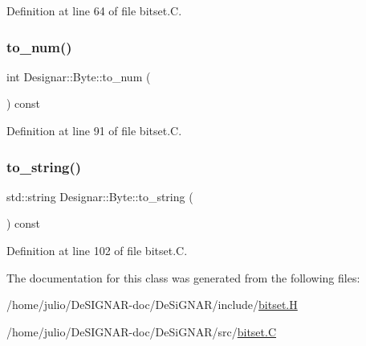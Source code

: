 Definition at line 64 of file bitset.\+C.

\mbox{\label{class_designar_1_1_byte_a1f10a6e5ad399f62c0d53ace68c7e43d}} 
\subsubsection{\texorpdfstring{to\+\_\+num()}{to\_num()}}
{\footnotesize\ttfamily int Designar\+::\+Byte\+::to\+\_\+num (\begin{DoxyParamCaption}{ }\end{DoxyParamCaption}) const}



Definition at line 91 of file bitset.\+C.

\mbox{\label{class_designar_1_1_byte_afddf5962874234208805ece07f31916d}} 
\subsubsection{\texorpdfstring{to\+\_\+string()}{to\_string()}}
{\footnotesize\ttfamily std\+::string Designar\+::\+Byte\+::to\+\_\+string (\begin{DoxyParamCaption}{ }\end{DoxyParamCaption}) const}



Definition at line 102 of file bitset.\+C.



The documentation for this class was generated from the following files\+:\begin{DoxyCompactItemize}
\item 
/home/julio/\+De\+S\+I\+G\+N\+A\+R-\/doc/\+De\+Si\+G\+N\+A\+R/include/\hyperlink{bitset_8_h}{bitset.\+H}\item 
/home/julio/\+De\+S\+I\+G\+N\+A\+R-\/doc/\+De\+Si\+G\+N\+A\+R/src/\hyperlink{bitset_8_c}{bitset.\+C}\end{DoxyCompactItemize}
